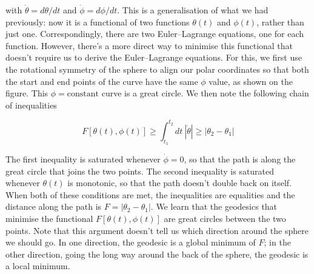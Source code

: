 \documentclass[11pt,a4paper,twoside]{article}
\newcommand{\pnum}[1]{\makebox[0pt][r]{\scriptsize\textbf{[#1]}\hspace{0.7em}}}
\begin{document}

\begin{figure}

    \centering


\end{figure}

\noindent with $\dot\theta=d\theta/dt$ and $\dot\phi=d\phi/dt$. This is a generalisation of what we had previously: now it is a functional of two functions $\theta(t)$ and $\phi(t)$, rather than just one. Correspondingly, there are two Euler--Lagrange equations, one for each function. However, there's a more direct way to minimise this functional that doesn't require us to derive the Euler--Lagrange equations. For this, we first use the rotational symmetry of the sphere to align our polar coordinates so that both the start and end points of the curve have the same $\phi$ value, as shown on the figure. This $\phi=\text{constant}$ curve is a great circle. We then note the following chain of inequalities

\begin{equation}
    F[\theta(t),\phi(t)]\geq\int_{t_1}^{t_2}dt\ |\dot\theta|\geq|\theta_2-\theta_1|\tag{7.19}
\end{equation}

\noindent\pnum{27}The first inequality is saturated whenever $\dot\phi=0$, so that the path is along the great circle that joins the two points. The second inequality is saturated whenever $\theta(t)$ is monotonic, so that the path doesn't double back on itself. When both of these conditions are met, the inequalities are equalities and the distance along the path is $F=|\theta_2-\theta_1|$. We learn that the geodesics that minimise the functional $F[\theta(t),\phi(t)]$ are great circles between the two points. Note that this argument doesn't tell us which direction around the sphere we should go. In one direction, the geodesic is a global minimum of $F$; in the other direction, going the long way around the back of the sphere, the geodesic is a local minimum.
\end{document}
